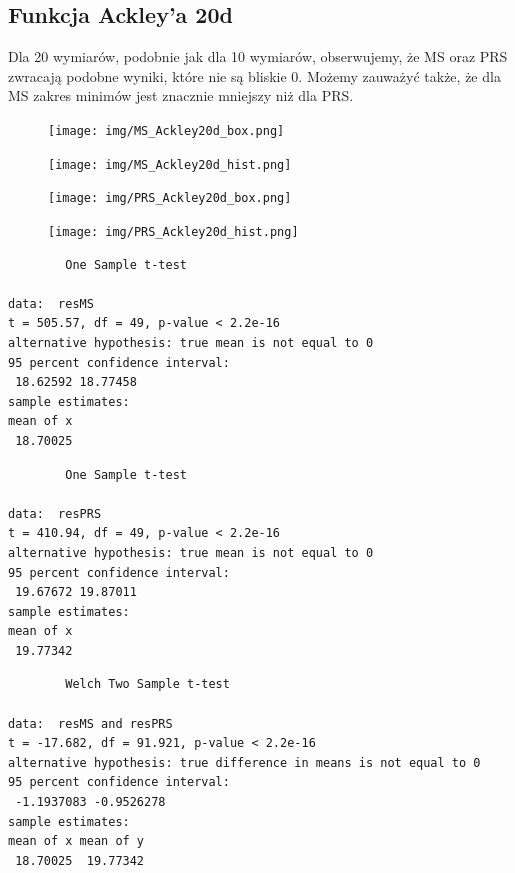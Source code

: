 \documentclass{article}
\begin{document}
\subsection{Funkcja Ackley'a 20d}
\hspace{0.5cm} Dla 20 wymiarów, podobnie jak dla 10 wymiarów, obserwujemy, że MS oraz PRS zwracają podobne wyniki, które nie są bliskie 0. Możemy zauważyć także, że dla MS zakres minimów jest znacznie mniejszy niż dla PRS.

\begin{figure}[H]
    \centering
    \texttt{[image: img/MS\_Ackley20d\_box.png]}
    \label{fig:ackley}
\end{figure}

\begin{figure}[H]
    \centering
    \texttt{[image: img/MS\_Ackley20d\_hist.png]}
    \label{fig:ackley}
\end{figure}

\begin{figure}[H]
    \centering
    \texttt{[image: img/PRS\_Ackley20d\_box.png]}
    \label{fig:ackley}
\end{figure}

\begin{figure}[H]
    \centering
    \texttt{[image: img/PRS\_Ackley20d\_hist.png]}
    \label{fig:ackley}
\end{figure}

\newpage
\vspace{25pt}

\begin{verbatim}
        One Sample t-test

data:  resMS
t = 505.57, df = 49, p-value < 2.2e-16
alternative hypothesis: true mean is not equal to 0
95 percent confidence interval:
 18.62592 18.77458
sample estimates:
mean of x
 18.70025
\end{verbatim}

\vspace{50pt}

\begin{verbatim}
        One Sample t-test

data:  resPRS
t = 410.94, df = 49, p-value < 2.2e-16
alternative hypothesis: true mean is not equal to 0
95 percent confidence interval:
 19.67672 19.87011
sample estimates:
mean of x
 19.77342
\end{verbatim}

\vspace{50pt}

\begin{verbatim}
        Welch Two Sample t-test

data:  resMS and resPRS
t = -17.682, df = 91.921, p-value < 2.2e-16
alternative hypothesis: true difference in means is not equal to 0
95 percent confidence interval:
 -1.1937083 -0.9526278
sample estimates:
mean of x mean of y
 18.70025  19.77342
\end{verbatim}
\end{document}
